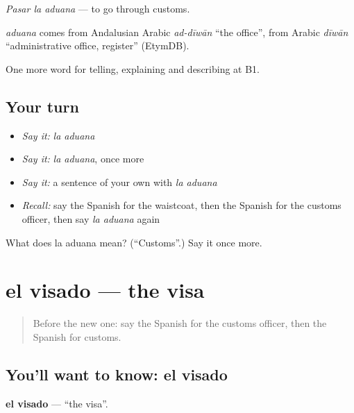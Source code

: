 \emph{Pasar la aduana} — to go through customs.

\begin{cousinweb}
\emph{aduana} comes from Andalusian Arabic \emph{ad-dīwān} \textquotedblleft{}the office\textquotedblright{}, from Arabic \emph{dīwān} \textquotedblleft{}administrative office, register\textquotedblright{} (EtymDB).
\end{cousinweb}

\begin{grammarlens}[title={What you've built}]
One more word for telling, explaining and describing at B1.
\end{grammarlens}

\subsection*{Your turn}
\begin{itemize}
\raggedright
  \item \emph{Say it:} \emph{la aduana}
  \item \emph{Say it:} \emph{la aduana}, once more
  \item \emph{Say it:} a sentence of your own with \emph{la aduana}
  \item \emph{Recall:} say the Spanish for the waistcoat, then the Spanish for the customs officer, then say \emph{la aduana} again
\end{itemize}

\begin{tcolorbox}[breakable,colback=teal!4,colframe=teal!35!black,title={Before you move on}]
What does la aduana mean? (\textquotedblleft{}Customs\textquotedblright{}.) Say it once more.
\end{tcolorbox}
\section[el visado]{el visado — the visa}

\label{lesson:ES-C656-visado}



\begin{quote}
Before the new one: say the Spanish for the customs officer, then the Spanish for customs.
\end{quote}

\subsection*{You'll want to know: el visado}
\textbf{el visado} — \textquotedblleft{}the visa\textquotedblright{}.

